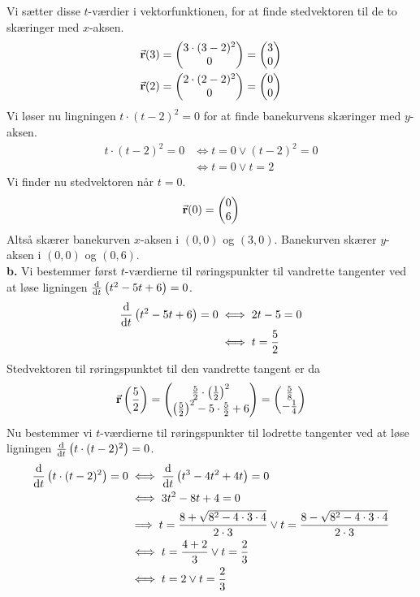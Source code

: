 \documentclass{article}
\begin{document}
Vi sætter disse $t$-værdier i vektorfunktionen, for at finde stedvektoren til de to skæringer med $x$-aksen.
\begin{equation*}
\begin{split}
  \va{r}(3)&=\mqty(3 \cdot (3-2)^2\\ 0) =\mqty(3\\ 0) \\ 
  \va{r}(2)&=\mqty(2 \cdot (2-2)^2\\ 0) =\mqty(0\\ 0) 
\end{split}
\end{equation*}
Vi løser nu lingningen $t \cdot (t-2)^2=0$ for at finde banekurvens skæringer med $y$-aksen. 
\begin{equation*}
\begin{split}
  t \cdot (t-2)^2=0 &\iff t=0 \lor (t-2)^2=0\\ 
  &\iff t=0 \lor t=2
\end{split}
\end{equation*}
Vi finder nu stedvektoren når $t=0$.
\[
\va{r}(0)=\mqty(0\\ 6) 
\] 
Altså skærer banekurven $x$-aksen i $(0,0)$ og $(3,0)$.
Banekurven skærer $y$-aksen i $(0,0)$ og $(0,6)$.\\[1ex]
\textbf{b.}
Vi bestemmer først $t$-værdierne til røringspunkter til vandrette tangenter ved at løse ligningen $\dv{t}\left(t^2-5t+6\right)=0$.
\begin{equation*}
\begin{split}
  \dv{t}\left(t^2-5t+6\right)=0 &\iff 2t-5=0 \\ 
  &\iff t=\frac{5}{2}
\end{split}
\end{equation*}
Stedvektoren til røringspunktet til den vandrette tangent er da
\[
\va{r}\left(\frac{5}{2}\right) =\mqty(\frac{5}{2} \cdot \left(\frac{1}{2}\right)^2\\ \left(\frac{5}{2}\right)^2 - 5 \cdot \frac{5}{2} + 6 ) =\mqty(\frac{5}{8}\\ -\frac{1}{4}) 
\] 
Nu bestemmer vi $t$-værdierne til røringspunkter til lodrette tangenter ved at løse ligningen $\dv{t}\left(t \cdot (t-2)^2\right) =0$.
\begin{equation*}
\begin{split}
  \dv{t}\left(t \cdot (t-2)^2\right) =0 &\iff \dv{t}\left(t^3-4t^2+4t\right) =0 \\ 
  &\iff 3t^2-8t+4=0\\ 
  &\implies t=\frac{8+\sqrt{8^2-4 \cdot 3 \cdot 4} }{2 \cdot 3} \lor t=\frac{8-\sqrt{8^2-4 \cdot 3 \cdot 4} }{2 \cdot 3}\\ 
  &\iff t=\frac{4+2}{3} \lor t=\frac{2}{3}\\ 
  &\iff t=2 \lor t=\frac{2}{3}
\end{split}
\end{equation*}
\end{document}
